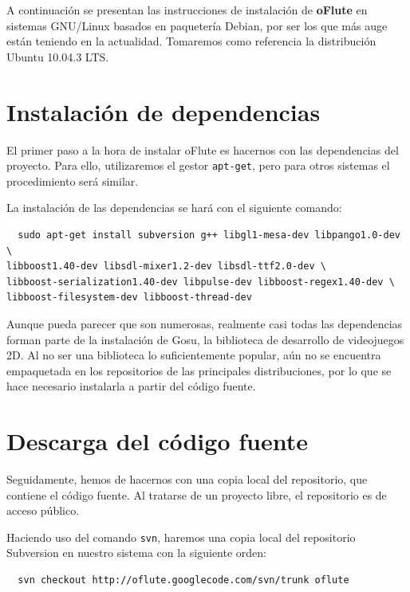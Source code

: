 A continuación se presentan las instrucciones de instalación de \textbf{oFlute}
en sistemas GNU/Linux basados en paquetería Debian\cite{refdebian}, por
ser los que más auge están teniendo en la actualidad. Tomaremos como referencia
la distribución Ubuntu 10.04.3 LTS\cite{refubuntu}.

\section{Instalación de dependencias}

El primer paso a la hora de instalar oFlute es hacernos con las dependencias del
proyecto. Para ello, utilizaremos el gestor \texttt{apt-get}, pero para otros
sistemas el procedimiento será similar.

La instalación de las dependencias se hará con el siguiente comando:

\begin{verbatim}
  sudo apt-get install subversion g++ libgl1-mesa-dev libpango1.0-dev \
libboost1.40-dev libsdl-mixer1.2-dev libsdl-ttf2.0-dev \
libboost-serialization1.40-dev libpulse-dev libboost-regex1.40-dev \
libboost-filesystem-dev libboost-thread-dev 
\end{verbatim}

Aunque pueda parecer que son numerosas, realmente casi todas las dependencias
forman parte de la instalación de Gosu, la biblioteca de desarrollo de
videojuegos 2D. Al no ser una biblioteca lo suficientemente popular, aún no se
encuentra empaquetada en los repositorios de las principales distribuciones, por
lo que se hace necesario instalarla a partir del código fuente.

\section{Descarga del código fuente}

Seguidamente, hemos de hacernos con una copia local del repositorio, que
contiene el código fuente. Al tratarse de un proyecto libre, el repositorio es
de acceso público\cite{ofluteforja}.

Haciendo uso del comando \texttt{svn}, haremos una copia local del repositorio
Subversion\cite{refsubversion} en nuestro sistema con la siguiente orden:

\begin{verbatim}
  svn checkout http://oflute.googlecode.com/svn/trunk oflute
\end{verbatim}

